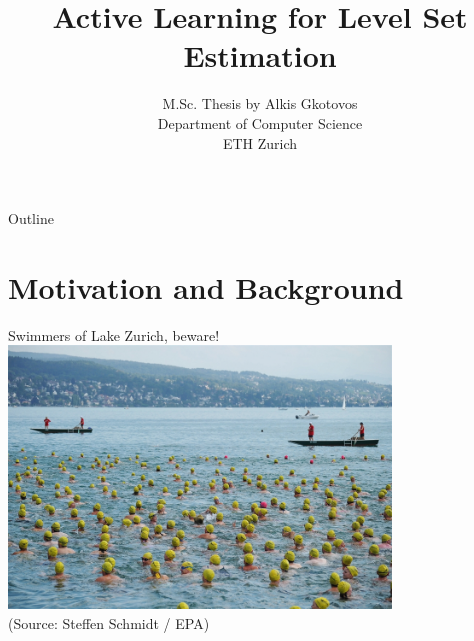 \documentclass[10pt]{beamer}
\title[Active Learning for Level Set Estimation]
{Active Learning for Level Set Estimation}
\author[Alkis Gkotovos]{
\footnotesize
M.Sc. Thesis by Alkis Gkotovos\\
Department of Computer Science\\
ETH Zurich
}
\date[M.Sc. Thesis presentation]{
\footnotesize
Supervised by Prof. Andreas Krause

}
\begin{document}
\begin{frame}
  \titlepage
\end{frame}

\begin{frame}{Outline}
  \tableofcontents
\end{frame}


\section{Motivation and Background}

\begin{frame}
\begin{center}
Swimmers of Lake Zurich, beware!\\
\vspace{0.2in}
\includegraphics[width=4in]{figures/swimmers.jpg}\\[-0.5em]
{\tiny (Source: Steffen Schmidt / EPA)}
\end{center}
\end{frame}
\end{document}
